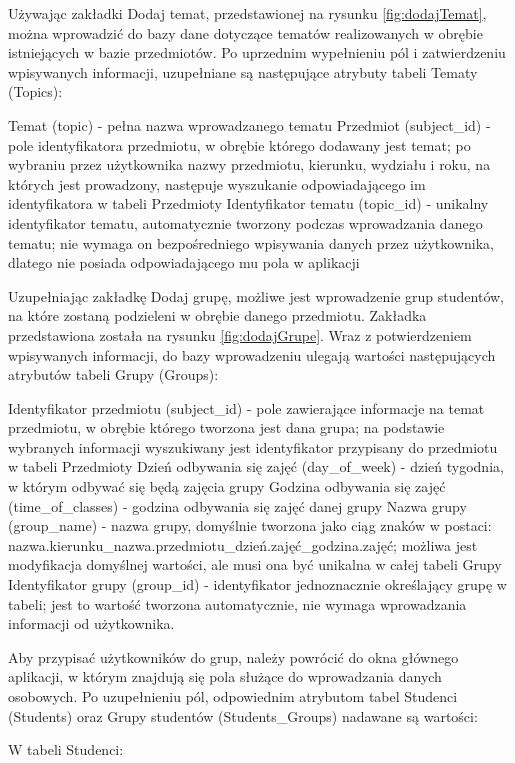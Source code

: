 Używając zakładki Dodaj temat, przedstawionej na rysunku \ref{fig:dodajTemat}, można wprowadzić do bazy dane dotyczące tematów realizowanych w obrębie istniejących w bazie przedmiotów. Po uprzednim wypełnieniu pól i zatwierdzeniu wpisywanych informacji, uzupełniane są następujące atrybuty tabeli Tematy (Topics):

Temat (topic) - pełna nazwa wprowadzanego tematu
Przedmiot (subject\_id) - pole identyfikatora przedmiotu, w obrębie którego dodawany jest temat; po wybraniu przez użytkownika nazwy przedmiotu, kierunku, wydziału i roku, na których jest prowadzony, następuje wyszukanie odpowiadającego im identyfikatora w tabeli Przedmioty
Identyfikator tematu (topic\_id) - unikalny identyfikator tematu, automatycznie tworzony podczas wprowadzania danego tematu; nie wymaga on bezpośredniego wpisywania danych przez użytkownika, dlatego nie posiada odpowiadającego mu pola w aplikacji

Uzupełniając zakładkę Dodaj grupę, możliwe jest wprowadzenie grup studentów, na które zostaną podzieleni w obrębie danego przedmiotu. Zakładka przedstawiona została na rysunku \ref{fig:dodajGrupe}. Wraz z potwierdzeniem wpisywanych informacji, do bazy wprowadzeniu ulegają wartości następujących atrybutów tabeli Grupy (Groups):

Identyfikator przedmiotu (subject\_id) - pole zawierające informacje na temat przedmiotu, w obrębie którego tworzona jest dana grupa; na podstawie wybranych informacji wyszukiwany jest identyfikator przypisany do przedmiotu w tabeli Przedmioty
Dzień odbywania się zajęć (day\_of\_week) - dzień tygodnia, w którym odbywać się będą zajęcia grupy
Godzina odbywania się zajęć (time\_of\_classes) - godzina odbywania się zajęć danej grupy
Nazwa grupy (group\_name) - nazwa grupy, domyślnie tworzona jako ciąg znaków w postaci: nazwa.kierunku\_nazwa.przedmiotu\_dzień.zajęć\_godzina.zajęć; możliwa jest modyfikacja domyślnej wartości, ale musi ona być unikalna w całej tabeli Grupy
Identyfikator grupy (group\_id) - identyfikator jednoznacznie określający grupę w tabeli; jest to wartość tworzona automatycznie, nie wymaga wprowadzania informacji od użytkownika.

Aby przypisać użytkowników do grup, należy powrócić do okna głównego aplikacji, w którym znajdują się pola służące do wprowadzania danych osobowych. Po uzupełnieniu pól, odpowiednim atrybutom tabel Studenci (Students) oraz Grupy studentów (Students\_Groups) nadawane są wartości:

W tabeli Studenci:

